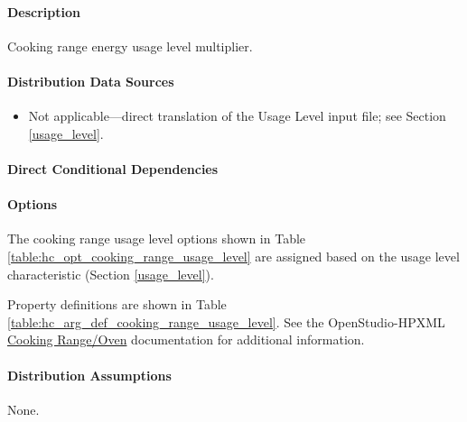 \paragraph{Description}
% 
Cooking range energy usage level multiplier.

\paragraph{Distribution Data Sources}
% 
\begin{itemize}
\item 
Not applicable---direct translation of the Usage Level input file; see Section \ref{usage_level}.
\end{itemize}

\paragraph{Direct Conditional Dependencies}


\paragraph{Options}
The cooking range usage level options shown in Table \ref{table:hc_opt_cooking_range_usage_level} are assigned based on the usage level characteristic (Section \ref{usage_level}).



Property definitions are shown in Table \ref{table:hc_arg_def_cooking_range_usage_level}. See the OpenStudio-HPXML \href{https://openstudio-hpxml.readthedocs.io/en/v1.10.0/workflow_inputs.html#hpxml-cooking-range-oven}{Cooking Range/Oven} documentation for additional information.



\paragraph{Distribution Assumptions}
% 
None.
